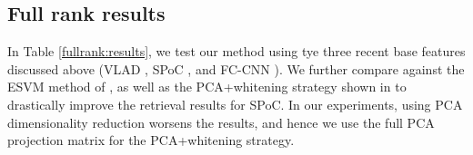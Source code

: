 



\subsection{Full rank results}
In Table \ref{fullrank:results}, we test our method using tye three recent base features discussed above (VLAD \cite{Delhumeau2013}, SPoC \cite{babenko15}, and FC-CNN \cite{Sharif}). We further compare against the ESVM method of \cite{ZePe15}, as well as the PCA+whitening strategy shown in \cite{babenko15} to drastically improve the retrieval results for SPoC. In our experiments, using PCA dimensionality reduction worsens the results, and hence we use the full PCA projection matrix for the PCA+whitening strategy.

